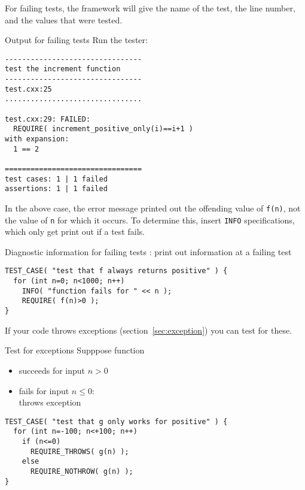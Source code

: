 For failing tests, the framework will give
the name of the test, the line number,
and the values that were tested.

\begin{block}{Output for failing tests}
  \label{sl:catch-fail}
  \small
  Run the tester:
\begin{verbatim}
--------------------------------
test the increment function
--------------------------------
test.cxx:25
................................

test.cxx:29: FAILED:
  REQUIRE( increment_positive_only(i)==i+1 )
with expansion:
  1 == 2

================================
test cases: 1 | 1 failed
assertions: 1 | 1 failed
\end{verbatim}
\end{block}

In the above case, the error message
printed out the offending value of \lstinline+f(n)+,
not the value of \lstinline+n+ for which it occurs.
To determine this, insert \lstinline+INFO+ specifications,
which only get print out if a test fails.

\begin{block}{Diagnostic information for failing tests}
  \label{sl:catch-info}
  : print out information at a failing test
\begin{lstlisting}
TEST_CASE( "test that f always returns positive" ) {
  for (int n=0; n<1000; n++)
    INFO( "function fails for " << n );
    REQUIRE( f(n)>0 );  
}  
\end{lstlisting}
\end{block}

If your code throws exceptions (section~\ref{sec:exception})
you can test for these.

\begin{block}{Test for exceptions}
  \label{sl:catch-case-throw}
Supppose function 
\begin{itemize}
\item succeeds for input $n>0$
\item fails for input $n\leq 0$:\\ throws exception
\end{itemize}

\begin{lstlisting}
TEST_CASE( "test that g only works for positive" ) {
  for (int n=-100; n<+100; n++)
    if (n<=0)
      REQUIRE_THROWS( g(n) );  
    else
      REQUIRE_NOTHROW( g(n) );  
}
\end{lstlisting}
\end{block}

